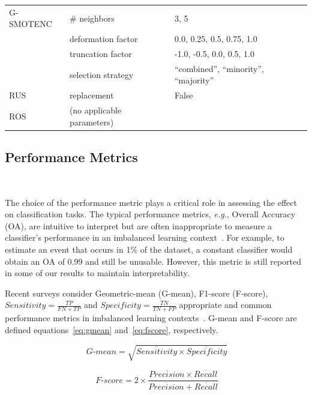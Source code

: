 \begin{table}[ht]
\begin{tabular}{lll}
		G-SMOTENC       & \# neighbors                     & 3, 5                           \\
                        & deformation factor               & 0.0, 0.25, 0.5, 0.75, 1.0      \\
                        & truncation factor                & -1.0, -0.5, 0.0, 0.5, 1.0      \\
                        & selection strategy               & ``combined'',
                        ``minority'', ``majority''\\
		RUS             & replacement                      & False                          \\
		ROS             & (no applicable parameters)       &                                \\
		\bottomrule
	\end{tabular}
\end{table}

\subsection{Performance Metrics}~\label{sec:performance_metrics-gsmotenc}

The choice of the performance metric plays a critical role in assessing
the effect on classification tasks. The typical performance metrics,
\textit{e.g.}, Overall Accuracy (OA), are intuitive to interpret but are often
inappropriate to measure a classifier's performance in an imbalanced learning
context~\cite{sun2009classification}. For example, to estimate an event that
occurs in 1\% of the dataset, a constant classifier would obtain an OA of 0.99
and still be unusable. However, this metric is still reported in some of our
results to maintain interpretability.

Recent surveys consider Geometric-mean (G-mean), F1-score
(F-score), $Sensitivity = \frac{TP}{FN+TP}$ and $Specificity = \frac{TN}{TN +
FP}$ appropriate and common performance metrics in imbalanced learning
contexts~\cite{rout2018handling, Jeni2013,
japkowicz2013assessment}. G-mean and F-score are defined
equations~\ref{eq:gmean} and~\ref{eq:fscore}, respectively.

\begin{equation}~\label{eq:gmean}
    \ensuremath{\textit{G-mean}} = \sqrt{\overline{Sensitivity} \times
    \overline{Specificity}}
\end{equation}

\begin{equation}~\label{eq:fscore}
    \ensuremath{\textit{F-score}} = 2\times\frac{\overline{Precision} \times
    \overline{Recall}}{\overline{Precision} + \overline{Recall}}
\end{equation}

